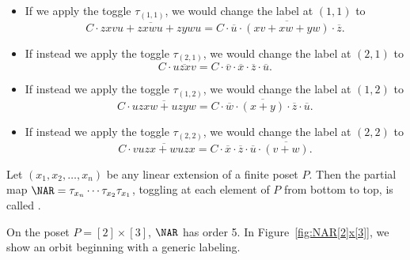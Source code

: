 \begin{exam}
\begin{itemize}
\item If we apply the toggle $\tau_{(1,1)}$,
we would change the label at $(1,1)$ to
\[
C\cdot \overline{zxvu+zxwu+zywu}=
C\cdot \overline{u}\cdot\overline{(xv+xw+yw)}
\cdot\overline{z}.
\]
\item If instead we apply the toggle $\tau_{(2,1)}$,
we would change the label at $(2,1)$ to
\[
C\cdot \overline{uzxv}
=C\cdot \overline{v}\cdot \overline{x}\cdot \overline{z}\cdot \overline{u}.
\]
\item If instead we apply the toggle $\tau_{(1,2)}$,
we would change the label at $(1,2)$ to
\[
C\cdot \overline{uzxw+uzyw}
=C\cdot \overline{w}\cdot \overline{(x+y)}\cdot \overline{z}\cdot \overline{u}.
\]
\item If instead we apply the toggle $\tau_{(2,2)}$,
we would change the label at $(2,2)$ to
\[
C\cdot \overline{vuzx+wuzx}
=C\cdot \overline{x}\cdot \overline{z}\cdot \overline{u}\cdot \overline{(v+w)}.
\]
\end{itemize}
\end{exam}

\begin{defi}
Let $(x_1,x_2,\dots,x_n)$ be any linear extension of a finite poset $P$. Then the partial map $\NAR=\tau_{x_n}\cdots \tau_{x_2} \tau_{x_1}$, \ie toggling at each element of $P$
from bottom to top, is called .
\end{defi}

\begin{exam}\label{ex:NAR[2]x[3]}
On the poset $P=[2]\times[3]$, $\NAR$ has order 5.
In Figure~\ref{fig:NAR[2]x[3]}, we show an orbit beginning with a generic labeling.
\end{exam}

